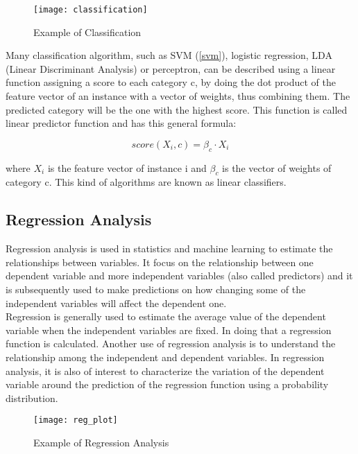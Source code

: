 \begin{figure}[H]
	\centering
	\texttt{[image: classification]}
	\caption{Example of Classification \cite{}}
	\label{fig:classification}
\end{figure}	

Many classification algorithm, such as SVM (\ref{svm}), logistic regression, LDA (Linear Discriminant Analysis) or perceptron, can be described using a linear function assigning a score to each category c, by doing the dot product of the feature vector of an instance with a vector of weights, thus combining them. The predicted category will be the one with the highest score. This function is called linear predictor function and has this general formula:

\begin{equation}
score(X_i, c) = \beta_c \cdot X_i
\end{equation}

where $X_i$ is the feature vector of instance i and $\beta_c$ is the vector of weights of category c. This kind of algorithms are known as linear classifiers.

\subsection{Regression Analysis} \label{regression}
Regression analysis is used in statistics and machine learning to estimate the relationships between variables. It focus on the relationship between one dependent variable and more independent variables (also called predictors) and it is subsequently used to make predictions on how changing some of the  independent variables will affect the dependent one. \cite{wiki:reg_an} \\
Regression is generally used to estimate the average value of the dependent variable when the independent variables are fixed. In doing that a regression function is calculated. Another use of regression analysis is to understand the relationship among the independent and dependent variables.
In regression analysis, it is also of interest to characterize the variation of the dependent variable around the prediction of the regression function using a probability distribution.

\begin{figure}[H]
	\centering
	\texttt{[image: reg\_plot]}
	\caption{Example of Regression Analysis}
	\label{fig:reg_plot}
\end{figure}	

